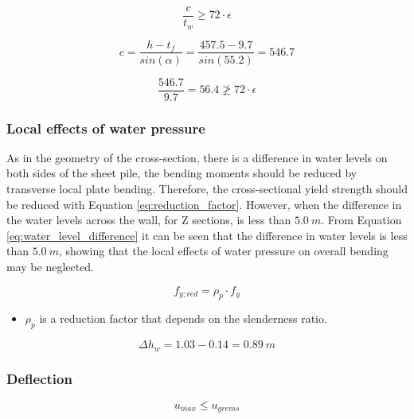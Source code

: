 \begin{equation}
    \frac{c}{t_{w}} \geq 72 \cdot \epsilon
    \label{eq:shear_buckling}
\end{equation}

\begin{equation}
    c = \frac{h - t_{f}}{sin(\alpha)} = \frac{457.5 - 9.7}{sin(55.2)} = 546.7 
\end{equation}

\begin{equation}
    \frac{546.7}{9.7} = 56.4 \ngeq 72 \cdot \epsilon 
    \label{eq:no_shear_buckling}
\end{equation}

\subsubsection{Local effects of water pressure}

As in the geometry of the cross-section, there is a difference in water levels on both sides of the sheet pile, the bending moments should be reduced by transverse local plate bending. Therefore, the cross-sectional yield strength should be reduced with Equation \ref{eq:reduction_factor}. However, when the difference in the water levels across the wall, for Z sections, is less than $5.0 \ m$. From Equation \ref{eq:water_level_difference} it can be seen that the difference in water levels is less than $5.0 \ m$, showing that the local effects of water pressure on overall bending may be neglected. 

\begin{equation}
    f_{y;red} = \rho_{p} \cdot f_{y}
    \label{eq:reduction_factor}
\end{equation}

\begin{itemize}
    \item $\rho_{p}$ is a reduction factor that depends on the slenderness ratio. 
\end{itemize}

\begin{equation}
    \Delta h_w = 1.03 - 0.14 = 0.89 \ m
    \label{eq:water_level_difference}
\end{equation}

\subsubsection{Deflection}

\begin{equation}
    u_{max} \leq u_{grems}
\end{equation}

